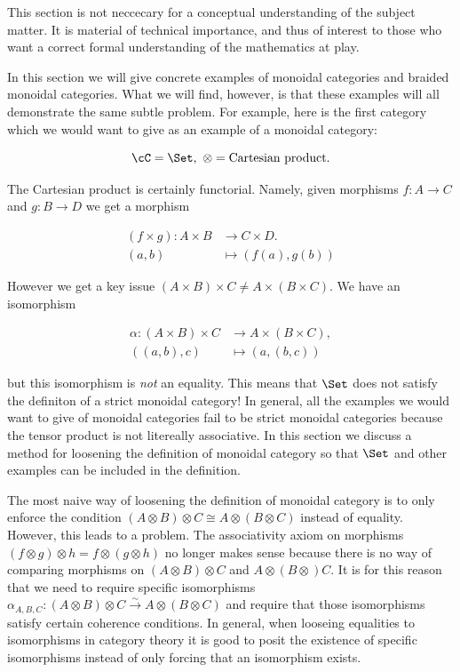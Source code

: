 \begin{warn} This section is not neccecary for a conceptual understanding of the subject matter. It is material of technical importance, and thus of interest to those who want a correct formal understanding of the mathematics at play.
\end{warn}

In this section we will give concrete examples of monoidal categories and braided monoidal categories. What we will find, however, is that these examples will all demonstrate the same subtle problem. For example, here is the first category which we would want to give as an example of a monoidal category:

$$\cC=\Set,\,\, \otimes = \text{Cartesian product}.$$

The Cartesian product is certainly functorial. Namely, given morphisms $f:A\to C$ and $g:B\to D$ we get a morphism

\begin{align*}
(f\times g): A\times B &\xrightarrow{} C\times D.\\
(a,b)&\mapsto (f(a), g(b))
\end{align*}

However we get a key issue $(A\times B)\times C \neq A\times (B\times C)$. We have an isomorphism

\begin{align*}
\alpha : (A\times B )\times C &\xrightarrow{} A \times (B\times C),\\
((a,b),c)&\mapsto (a,(b,c))
\end{align*}

but this isomorphism is {\em not} an equality. This means that $\Set$ does not satisfy the definiton of a strict monoidal category! In general, all the examples we would want to give of monoidal categories fail to be strict monoidal categories because the tensor product is not litereally associative. In this section we discuss a method for loosening the definition of monoidal category so that $\Set$ and other examples can be included in the definition.

\begin{rem}
The most naive way of loosening the definition of monoidal category is to only enforce the condition $(A\otimes B)\otimes C\cong A\otimes (B\otimes C)$ instead of equality. However, this leads to a problem. The associativity axiom on morphisms $(f\otimes g)\otimes h = f\otimes (g\otimes h)$  no longer makes sense because there is no way of comparing morphisms on $(A\otimes B)\otimes C$ and $A\otimes (B\otimes )C$. It is for this reason that we need to require specific isomorphisms $\alpha_{A,B,C}:(A\otimes B)\otimes C\xrightarrow{\sim} A\otimes (B\otimes C)$ and require that  those isomorphisms satisfy certain coherence conditions. In general, when looseing equalities to isomorphisms in category theory it is good to posit the existence of specific isomorphisms instead of only forcing that an isomorphism exists.
\end{rem}


